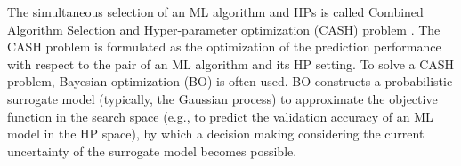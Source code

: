 
The simultaneous selection of an ML algorithm and HPs is called Combined Algorithm Selection and Hyper-parameter optimization (CASH) problem \cite{thornton2013auto,NIPS2015_11d0e628}.
%
The CASH problem is formulated as the optimization of the prediction performance with respect to the pair of an ML algorithm and its HP setting.
%
To solve a CASH problem, Bayesian optimization (BO) \cite{brochu2010tutorial,snoek2012practical,bergstra2011algorithms} is often used.
%
BO constructs a probabilistic surrogate model (typically, the Gaussian process) to approximate the objective function in the search space (e.g., to predict the validation accuracy of an ML model in the HP space), by which a decision making considering the current uncertainty of the surrogate model becomes possible. 



